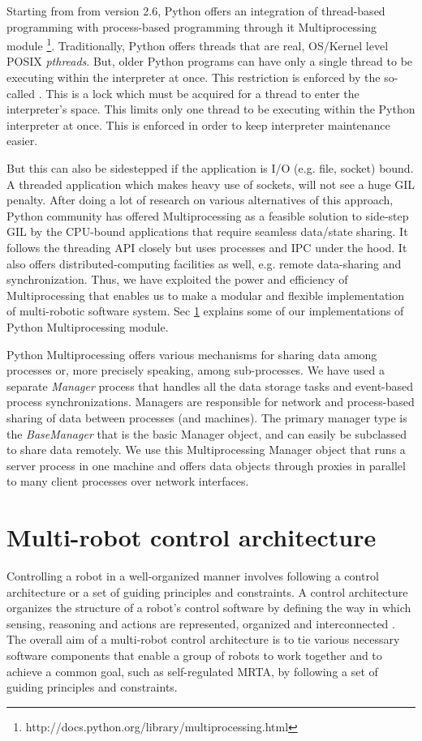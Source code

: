 Starting from from version 2.6, Python offers an integration of thread-based programming with process-based programming through it Multiprocessing module \footnote{http://docs.python.org/library/multiprocessing.html}. Traditionally, Python offers threads that are real, OS/Kernel level POSIX {\em pthreads}.  But, older Python programs can have only a single thread to be executing within the interpreter at once. This restriction is enforced by the so-called . This is a lock which must be
 acquired for a thread to enter the interpreter's space.
 This limits only one thread to  be executing within the Python interpreter at once.  This is enforced  in order to keep interpreter maintenance easier.
 
But this can also be sidestepped if the application is I/O (e.g. file, socket) bound. A threaded application which makes heavy use of sockets, will not see a huge GIL penalty.  After  doing a lot of research on various alternatives of this approach, Python community has offered Multiprocessing as a feasible solution to side-step GIL by the CPU-bound applications that  require seamless data/state sharing.   It follows the threading API closely but uses processes and IPC under the hood. It also offers distributed-computing facilities as well, e.g. remote data-sharing and synchronization.  Thus, we have exploited the power and efficiency of Multiprocessing that enables us to make a modular and flexible implementation of multi-robotic software system. Sec \ref{expt-tools:arch} explains some of our implementations of Python Multiprocessing module.
 
Python Multiprocessing offers various mechanisms for sharing data among processes or, more precisely speaking, among sub-processes. We have used a separate {\em Manager} process that handles all the data storage tasks and event-based process synchronizations.  Managers are responsible for network and process-based sharing of data between processes (and machines).
 The primary manager type is the {\em BaseManager} that is the basic Manager object, and can easily be subclassed to share
 data remotely.  We use this Multiprocessing Manager object that runs a server process in one machine and offers data objects through proxies in parallel to many client  processes over network interfaces.
\section{Multi-robot control architecture}
\label{expt-tools:arch}
Controlling a robot in a well-organized manner involves following a control architecture or a set of guiding principles and constraints. A control architecture organizes the structure  of a robot's control software by defining the way in which sensing, reasoning and actions are represented, organized and interconnected \cite{Bekey2005}. The overall aim of a multi-robot control architecture is to tie various necessary software components that enable a group of robots to work together and to achieve a common goal, such as self-regulated MRTA, by following a set of guiding principles and constraints. 

